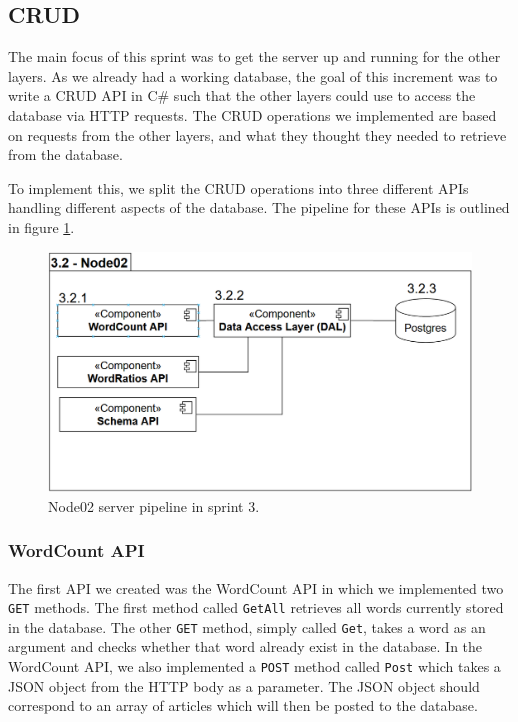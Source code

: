 \subsection{CRUD}

The main focus of this sprint was to get the server up and running for the other layers. 
As we already had a working database, the goal of this increment was to write a CRUD API in C\# such that the other layers could use to access the database via HTTP requests.
The CRUD operations we implemented are based on requests from the other layers, and what they thought they needed to retrieve from the database.

To implement this, we split the CRUD operations into three different APIs handling different aspects of the database. 
The pipeline for these APIs is outlined in figure \ref{Node02Sprint3}.

\begin{figure}[h]
    \centering
    \includegraphics[width=\linewidth]{Images/Node02Sprint3.PNG}
    \caption{Node02 server pipeline in sprint 3.}
    \label{Node02Sprint3}
\end{figure}

\subsubsection{WordCount API}
The first API we created was the WordCount API in which we implemented two \texttt{GET} methods.
The first method called \texttt{GetAll} retrieves all words currently stored in the database.
The other \texttt{GET} method, simply called \texttt{Get}, takes a word as an argument and checks whether that word already exist in the database.
In the WordCount API, we also implemented a \texttt{POST} method called \texttt{Post} which takes a JSON object from the HTTP body as a parameter. 
The JSON object should correspond to an array of articles which will then be posted to the database. 

